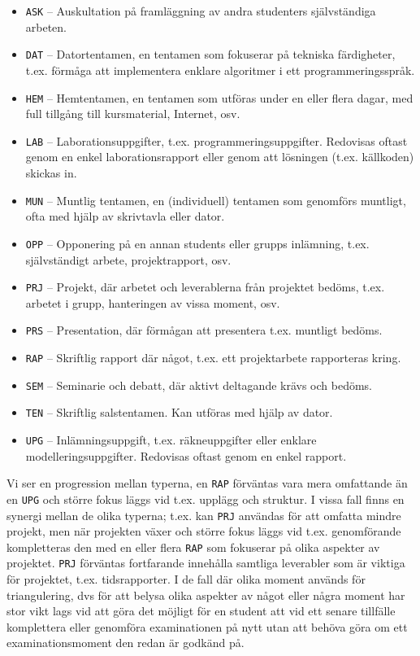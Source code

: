 \begin{itemize}
\item \texttt{ASK} -- Auskultation på framläggning av andra studenters självständiga arbeten.
\item \texttt{DAT} -- Datortentamen, en tentamen som fokuserar på tekniska färdigheter, t.ex. förmåga att implementera enklare algoritmer i ett programmeringsspråk.
\item \texttt{HEM} -- Hemtentamen, en tentamen som utföras under en eller flera dagar, med full tillgång till kursmaterial, Internet, osv. 
\item \texttt{LAB} -- Laborationsuppgifter, t.ex. programmeringsuppgifter. Redovisas oftast genom en enkel laborationsrapport eller genom att lösningen (t.ex. källkoden) skickas in.
\item \texttt{MUN} -- Muntlig tentamen, en (individuell) tentamen som genomförs muntligt, ofta med hjälp av skrivtavla eller dator. 
\item \texttt{OPP} -- Opponering på en annan students eller grupps inlämning, t.ex. självständigt arbete, projektrapport, osv.
\item \texttt{PRJ} -- Projekt, där arbetet och leverablerna från projektet bedöms, t.ex. arbetet i grupp, hanteringen av vissa moment, osv.
\item \texttt{PRS} -- Presentation, där förmågan att presentera t.ex. muntligt bedöms. 
\item \texttt{RAP} -- Skriftlig rapport där något, t.ex. ett projektarbete rapporteras kring.
\item \texttt{SEM} -- Seminarie och debatt, där aktivt deltagande krävs och bedöms.
\item \texttt{TEN} -- Skriftlig salstentamen. Kan utföras med hjälp av dator.
\item \texttt{UPG} -- Inlämningsuppgift, t.ex. räkneuppgifter eller enklare modelleringsuppgifter. Redovisas oftast genom en enkel rapport.
\end{itemize}

Vi ser en progression mellan typerna, en \texttt{RAP} förväntas vara mera omfattande än en \texttt{UPG} och större fokus läggs vid t.ex. upplägg och struktur. I vissa fall finns en synergi mellan de olika typerna; t.ex. kan \texttt{PRJ} användas för att omfatta mindre projekt, men när projekten växer och större fokus läggs vid t.ex. genomförande kompletteras den med en eller flera \texttt{RAP} som fokuserar på olika aspekter av projektet. \texttt{PRJ} förväntas fortfarande innehålla samtliga leverabler som är viktiga för projektet, t.ex. tidsrapporter. I de fall där olika moment används för triangulering, dvs för att belysa olika aspekter av något eller några moment har stor vikt lags vid att göra det möjligt för en student att vid ett senare tillfälle komplettera eller genomföra examinationen på nytt utan att behöva göra om ett examinationsmoment den redan är godkänd på. 

